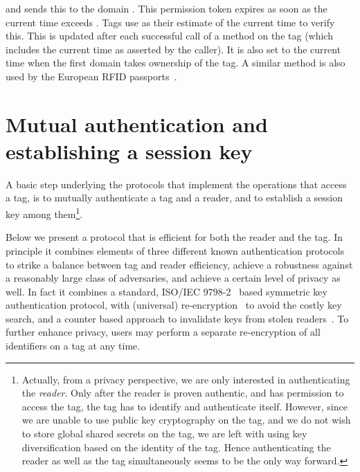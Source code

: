 and sends this to the domain . This permission token expires as soon as the
current 
time exceeds . Tags use  as their estimate of the current time
to verify this. 
This is updated after each successful call of a method on the tag (which
includes the current time as asserted by the caller).
It is also set to the current time when the first domain takes ownership of the
tag. 
A similar method is also used by the European RFID
passports~\cite{bsi2006extendedaccesscontrol,hoepman2006crossingborders}. 


\section{Mutual authentication and establishing a session key}
\label{sec-auth}

A basic step underlying the protocols that implement the operations that access
a tag, is to mutually authenticate a tag and a reader, and to establish a
session key among them\footnote{Actually, from a privacy perspective, we are only interested in
	authenticating the \emph{reader}. Only after the reader is
	proven  authentic, and has permission to access the tag, the tag
	has to identify and authenticate itself. However, since we are unable
	to use public key cryptography on the tag, and we do not wish to store
	global shared secrets on the tag, we are left with using key
	diversification based on the identity of the tag. Hence
	authenticating the reader as well as the tag simultaneously 
	seems to be the only way forward. 
}. 

Below we present a protocol that is efficient for both the reader and the tag. 
In principle it combines elements of three different known authentication
protocols to strike a balance between tag and reader efficiency, achieve a
robustness against a reasonably large class of adversaries, and achieve a
certain level of privacy as well. In fact it combines a standard, 
ISO/IEC 9798-2~\cite{ISO9798-2} based symmetric key authentication protocol, 
with (universal) re-encryption~\cite{juels2003squealing,golle2004reencryption}
to avoid the costly key search, and 
a counter based approach to invalidate keys from stolen 
readers~\cite{avoine2009compromised-readers}.
To further enhance privacy, users may perform a separate re-encryp\-tion of all
identifiers on a tag at any time.


